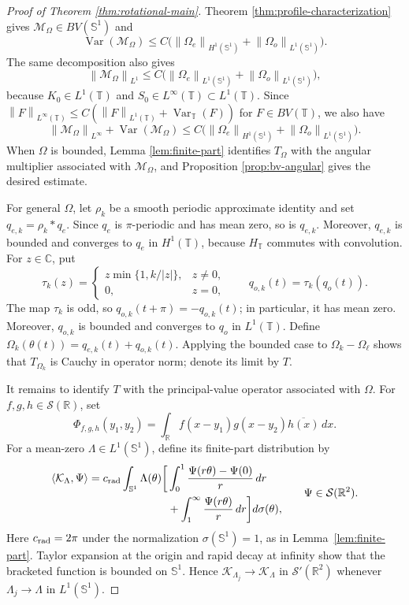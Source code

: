\documentclass[11pt]{amsart}
\theoremstyle{remark}
\numberwithin{equation}{section}
\newcommand{\R}{\mathbb R}
\newcommand{\C}{\mathbb C}
\newcommand{\T}{\mathbb T}
\newcommand{\Sph}{\mathbb S^1}
\newcommand{\cM}{\mathcal M}
\newcommand{\norm}[1]{\left\lVert #1\right\rVert}
\newcommand{\Var}{\operatorname{Var}}
\begin{document}
	\begin{proof}[Proof of Theorem \ref{thm:rotational-main}]
		Theorem \ref{thm:profile-characterization} gives
		\(\cM_\Omega\in BV(\Sph)\) and
		\[
		\Var(\cM_\Omega)
		\le
		C
		\bigl(
		\norm{\Omega_e}_{H^1(\Sph)}
		+
		\norm{\Omega_o}_{L^1(\Sph)}
		\bigr).
		\]
		The same decomposition also gives
		\[
		\norm{\cM_\Omega}_{L^1}
		\le
		C\bigl(
		\norm{\Omega_e}_{L^1(\Sph)}
		+
		\norm{\Omega_o}_{L^1(\Sph)}
		\bigr),
		\]
		because \(K_0\in L^1(\T)\) and \(S_0\in L^\infty(\T)\subset L^1(\T)\).
		Since
		\(\norm{F}_{L^\infty(\T)}\le C(\norm{F}_{L^1(\T)}+\Var_\T(F))\) for
		\(F\in BV(\T)\), we also have
		\[
		\norm{\cM_\Omega}_{L^\infty}
		+
		\Var(\cM_\Omega)
		\le
		C
		\bigl(
		\norm{\Omega_e}_{H^1(\Sph)}
		+
		\norm{\Omega_o}_{L^1(\Sph)}
		\bigr).
		\]
		When \(\Omega\) is bounded, Lemma \ref{lem:finite-part} identifies
		\(T_\Omega\) with the angular multiplier associated with
		\(\cM_\Omega\), and Proposition \ref{prop:bv-angular} gives the
		desired estimate.
		
		For general \(\Omega\), let \(\rho_k\) be a smooth periodic approximate
		identity and set \(q_{e,k}=\rho_k*q_e\).  Since \(q_e\) is \(\pi\)-periodic
		and has mean zero, so is \(q_{e,k}\).  Moreover, \(q_{e,k}\) is bounded and
		converges to \(q_e\) in \(H^1(\T)\), because \(H_\T\) commutes with
		convolution.  For \(z\in\C\), put
		\[
		\tau_k(z)=
		\begin{cases}
			z\min\{1,k/|z|\},&z\ne0,\\
			0,&z=0,
		\end{cases}
		\qquad q_{o,k}(t)=\tau_k(q_o(t)).
		\]
		The map \(\tau_k\) is odd, so \(q_{o,k}(t+\pi)=-q_{o,k}(t)\); in particular,
		it has mean zero.  Moreover, \(q_{o,k}\) is bounded and converges to \(q_o\)
		in \(L^1(\T)\).  Define
		\(\Omega_k(\theta(t))=q_{e,k}(t)+q_{o,k}(t)\).  Applying the bounded case to
		\(\Omega_k-\Omega_\ell\) shows that \(T_{\Omega_k}\) is Cauchy in operator
		norm; denote its limit by \(T\).
		
		It remains to identify \(T\) with the principal-value operator associated with
		\(\Omega\).  For \(f,g,h\in\mathcal S(\R)\), set
		\[
		\Phi_{f,g,h}(y_1,y_2)=\int_\R f(x-y_1)g(x-y_2)\overline{h(x)}\,dx.
		\]
		For a mean-zero \(\Lambda\in L^1(\Sph)\), define its finite-part distribution by
		\begin{equation}\label{eq:finite-part-L1}
			\begin{aligned}
				\langle \mathcal K_\Lambda,\Psi\rangle
				=
				c_{\rm rad}\int_{\Sph}\Lambda(\theta)\bigg[
				&\int_0^1\frac{\Psi(r\theta)-\Psi(0)}{r}\,dr\\
				&+\int_1^\infty\frac{\Psi(r\theta)}{r}\,dr
				\bigg]d\sigma(\theta),
			\end{aligned}
			\qquad \Psi\in\mathcal S(\R^2).
		\end{equation}
		Here \(c_{\rm rad}=2\pi\) under the normalization \(\sigma(\Sph)=1\), as in
		Lemma~\ref{lem:finite-part}.
		Taylor expansion at the origin and rapid decay at infinity show that the
		bracketed function is bounded on \(\Sph\).  Hence \(\mathcal K_{\Lambda_j}\to
		\mathcal K_\Lambda\) in \(\mathcal S'(\R^2)\) whenever \(\Lambda_j\to
		\Lambda\) in \(L^1(\Sph)\).
		

\end{proof}
\end{document}
